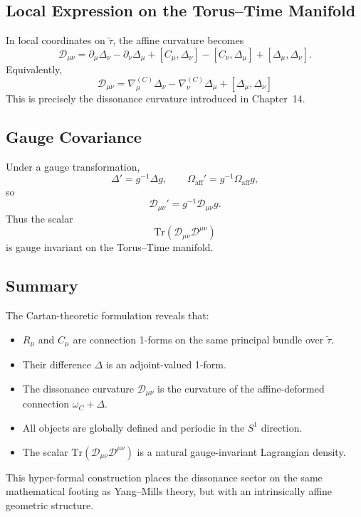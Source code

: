 \documentclass[12pt,openany]{book}
\theoremstyle{plain}
\theoremstyle{definition}
\theoremstyle{remark}
\begin{document}
\subsection*{Local Expression on the Torus--Time Manifold}

In local coordinates on $\tilde{\tau}$, the affine curvature becomes
\[
\mathcal{D}_{\mu\nu}
= \partial_\mu \Delta_\nu
- \partial_\nu \Delta_\mu
+ [C_\mu,\Delta_\nu]
- [C_\nu,\Delta_\mu]
+ [\Delta_\mu,\Delta_\nu].
\]
Equivalently,
\[
\boxed{
\mathcal{D}_{\mu\nu}
= \nabla_\mu^{(C)}\Delta_\nu
- \nabla_\nu^{(C)}\Delta_\mu
+ [\Delta_\mu,\Delta_\nu]
}
\]
This is precisely the dissonance curvature introduced in Chapter~14.

\subsection*{Gauge Covariance}

Under a gauge transformation,
\[
\Delta' = g^{-1}\Delta g,
\qquad
\Omega_{\mathrm{aff}}' = g^{-1}\Omega_{\mathrm{aff}} g,
\]
so
\[
\mathcal{D}_{\mu\nu}' = g^{-1}\mathcal{D}_{\mu\nu}g.
\]
Thus the scalar
\[
\mathrm{Tr}(\mathcal{D}_{\mu\nu}\mathcal{D}^{\mu\nu})
\]
is gauge invariant on the Torus--Time manifold.

\subsection*{Summary}

The Cartan-theoretic formulation reveals that:

\begin{itemize}
    \item $R_\mu$ and $C_\mu$ are connection 1-forms on the same principal
    bundle over $\tilde{\tau}$.
    \item Their difference $\Delta$ is an adjoint-valued 1-form.
    \item The dissonance curvature $\mathcal{D}_{\mu\nu}$ is the curvature of
    the affine-deformed connection $\omega_C + \Delta$.
    \item All objects are globally defined and periodic in the $S^1$
    direction.
    \item The scalar $\mathrm{Tr}(\mathcal{D}_{\mu\nu}\mathcal{D}^{\mu\nu})$
    is a natural gauge-invariant Lagrangian density.
\end{itemize}

This hyper-formal construction places the dissonance sector on the same
mathematical footing as Yang--Mills theory, but with an intrinsically affine
geometric structure.
\end{document}
